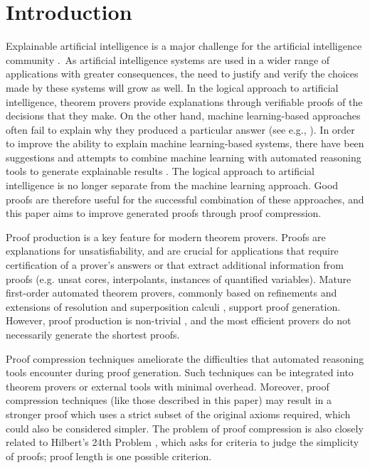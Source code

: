 \section{Introduction} 

Explainable artificial intelligence is a major challenge for the artificial intelligence community \cite{bonacina2017automated}.~As artificial intelligence systems are used in a wider range of applications with greater consequences, the need to justify and verify the choices made by these systems will grow as well.
In the logical approach to artificial intelligence, theorem provers provide explanations through verifiable proofs of the decisions that they make.
On the other hand, machine learning-based approaches often fail to explain why they produced a particular answer (see e.g., \cite{miller2019explanation}). 
In order to improve the ability to explain machine learning-based systems, there have been suggestions and attempts to combine machine learning with automated reasoning tools to generate explainable results \cite{bonacina2017automated,siebert2019corg}. 
The logical approach to artificial intelligence is no longer separate from the machine learning approach.
Good proofs are therefore useful for the successful combination of these approaches, and this paper aims to improve generated proofs through proof compression.

Proof production is a key feature for modern theorem provers. 
Proofs are explanations for unsatisfiability, and are crucial for applications that require certification of a prover's answers or that extract additional information from proofs (e.g. unsat cores, interpolants, instances of quantified variables).
Mature first-order automated theorem provers, commonly based on refinements and extensions of resolution and superposition calculi \cite{Vampire,EProver,Spass,spassT,prover9-mace4}, support proof generation. However, proof production is non-trivial \cite{SchulzAPPA}, and the most efficient provers do not necessarily generate the shortest proofs. 

Proof compression techniques ameliorate the difficulties that automated reasoning tools encounter during proof generation. Such techniques can be integrated into theorem provers or external tools with minimal overhead. Moreover, proof compression techniques (like those described in this paper) may result in a stronger proof which uses a strict subset of the original axioms required, which could also be considered simpler. The problem of proof compression is also closely related to Hilbert's 24th Problem \cite{Hilbert24Problem}, which asks for criteria to judge the simplicity of proofs; proof length is one possible criterion. 

